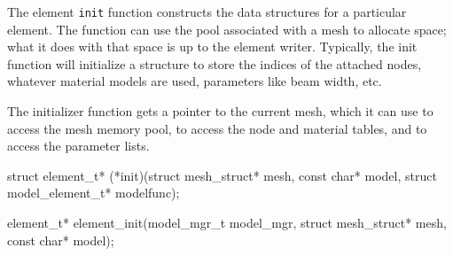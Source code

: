 The element {\tt{}init} function constructs the data structures
for a particular element.  The function can use the pool
associated with a mesh to allocate space; what it does with that
space is up to the element writer.  Typically, the init function
will initialize a structure to store the indices of the attached
nodes, whatever material models are used, parameters like beam
width, etc.

The initializer function gets a pointer to the current mesh,
which it can use to access the mesh memory pool, to access
the node and material tables, and to access the parameter lists.

\nwenddocs{}\endmoddef
struct element_t* (*init)(struct mesh_struct* mesh, const char* model,
                          struct model_element_t* modelfunc);
\nwendcode{}\nwdocspar

\nwenddocs{}\endmoddef
element_t* element_init(model_mgr_t model_mgr, 
                        struct mesh_struct* mesh, const char* model);
\nwendcode{}\nwdocspar


